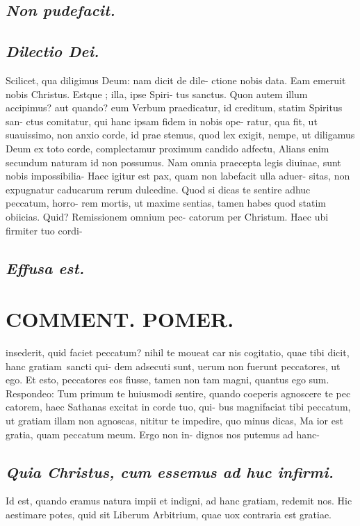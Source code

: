 \documentclass{article}
\begin{document}
\begin{pages}
\subsection*{\textit{Non pudefacit. }}
{}
\subsection*{\textit{Dilectio Dei. }}\pstart Scilicet, qua diligimus Deum: nam dicit de dile- ctione nobis data.   \pend\pstart Eam emeruit nobis Christus. Estque ; illa, ipse Spiri- tus sanctus. Quon autem illum accipimus? aut quando? eum Verbum praedicatur, id creditum, statim Spiritus san- ctus comitatur, qui hanc ipsam fidem in nobis ope- ratur, qua fit, ut suauissimo, non anxio corde, id prae stemus, quod lex exigit, nempe, ut diligamus Deum ex toto corde, complectamur proximum candido adfectu, Alians enim secundum naturam id non possumus. Nam omnia praecepta legis diuinae, sunt nobis impossibilia- Haec igitur est pax, quam non labefacit ulla aduer- sitas, non expugnatur caducarum rerum dulcedine. Quod si dicas te sentire adhuc peccatum, horro- rem mortis, ut maxime sentias, tamen habes quod statim obiicias. Quid? Remissionem omnium pec- catorum per Christum. Haec ubi firmiter tuo cordi-  \pend
{}
{}
\subsection*{\textit{Effusa est. }}\pstart  \pend
\section*{COMMENT. POMER.  }\pstart insederit, quid faciet peccatum? nihil te moueat car nis cogitatio, quae tibi dicit, hanc gratiam sancti qui- dem adsecuti sunt, uerum non fuerunt peccatores, ut ego. Et esto, peccatores eos fiusse, tamen non tam magni, quantus ego sum. Respondeo: Tum primum te huiusmodi sentire, quando coeperis agnoscere te pec catorem, haec Sathanas excitat in corde tuo, qui- bus magnifaciat tibi peccatum, ut gratiam illam non agnoscas, nititur te impedire, quo minus dicas, Ma ior est gratia, quam peccatum meum. Ergo non in- dignos nos putemus ad hanc-  \pend
{}
{}
\subsection*{\textit{Quia Christus, cum essemus ad huc infirmi. }}\pstart Id est, quando eramus natura impii et indigni, ad hanc gratiam, redemit nos. Hic aestimare potes, quid sit Liberum Arbitrium, quae uox contraria est gratiae.   \pend
{}
{}

\end{pages}
\end{document}
